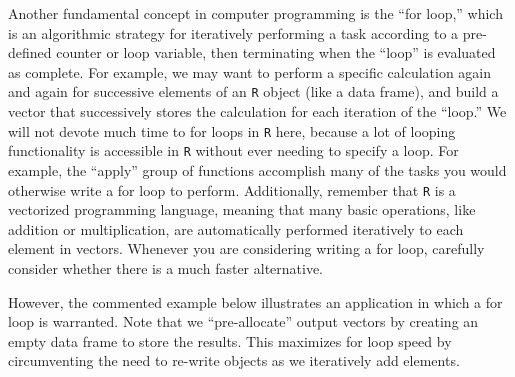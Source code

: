 \documentclass[]{book}
\newenvironment{Shaded}{\begin{snugshade}}{\end{snugshade}}
\newcommand{\CommentTok}[1]{\textcolor[rgb]{0.56,0.35,0.01}{\textit{#1}}}
\newcommand{\ControlFlowTok}[1]{\textcolor[rgb]{0.13,0.29,0.53}{\textbf{#1}}}
\newcommand{\DecValTok}[1]{\textcolor[rgb]{0.00,0.00,0.81}{#1}}
\newcommand{\KeywordTok}[1]{\textcolor[rgb]{0.13,0.29,0.53}{\textbf{#1}}}
\newcommand{\NormalTok}[1]{#1}
\newcommand{\OperatorTok}[1]{\textcolor[rgb]{0.81,0.36,0.00}{\textbf{#1}}}
\newcommand{\OtherTok}[1]{\textcolor[rgb]{0.56,0.35,0.01}{#1}}
\newcommand{\StringTok}[1]{\textcolor[rgb]{0.31,0.60,0.02}{#1}}
\begin{document}
Another fundamental concept in computer programming is the ``for loop,'' which is an algorithmic strategy for iteratively performing a task according to a pre-defined counter or loop variable, then terminating when the ``loop'' is evaluated as complete. For example, we may want to perform a specific calculation again and again for successive elements of an \texttt{R} object (like a data frame), and build a vector that successively stores the calculation for each iteration of the ``loop.'' We will not devote much time to for loops in \texttt{R} here, because a lot of looping functionality is accessible in \texttt{R} without ever needing to specify a loop. For example, the ``apply'' group of functions accomplish many of the tasks you would otherwise write a for loop to perform. Additionally, remember that \texttt{R} is a vectorized programming language, meaning that many basic operations, like addition or multiplication, are automatically performed iteratively to each element in vectors. Whenever you are considering writing a for loop, carefully consider whether there is a much faster alternative.

However, the commented example below illustrates an application in which a for loop is warranted. Note that we ``pre-allocate'' output vectors by creating an empty data frame to store the results. This maximizes for loop speed by circumventing the need to re-write objects as we iteratively add elements.

\begin{Shaded}
\end{Shaded}
\end{document}
